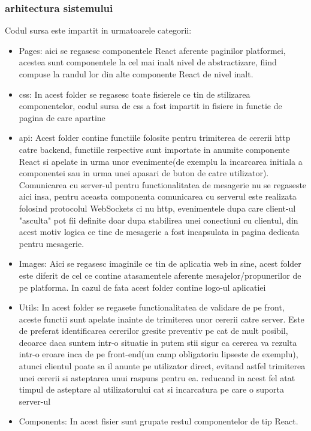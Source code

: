 \documentclass[12pt,a4paper,hidelinks]{report}
\theoremstyle{definition}
\theoremstyle{remark}
\begin{document}
\subsubsection{arhitectura sistemului}
Codul sursa este impartit in urmatoarele categorii:
\begin{itemize}
    \item Pages: aici se regasesc componentele React aferente paginilor platformei,
    acestea sunt componentele la cel mai inalt nivel de abstractizare, fiind compuse la randul lor
    din alte componente React de nivel inalt.
    \item css: In acest folder se regasesc toate fisierele ce tin de stilizarea componentelor, codul sursa de css
    a fost impartit in fisiere in functie de pagina de care apartine
    \item api: Acest folder contine functiile folosite pentru trimiterea de cererii http catre backend, functiile respective sunt importate in anumite componente React 
    si apelate in urma unor evenimente(de exemplu la incarcarea initiala a componentei sau in urma unei apasari de buton de catre utilizator). 
    Comunicarea cu server-ul pentru functionalitatea de mesagerie nu se regaseste aici insa, pentru aceasta componenta comunicarea cu serverul este realizata folosind protocolul 
    WebSockets ci nu http, evenimentele dupa care client-ul "asculta" pot fii definite doar dupa stabilirea unei conectiuni cu clientul, din acest motiv
    logica ce tine de mesagerie a fost incapsulata in pagina dedicata pentru mesagerie.
    \item Images: Aici se regasesc  imaginile ce tin de aplicatia web in sine, acest folder este diferit de cel ce contine 
    atasamentele aferente  mesajelor/propunerilor de pe platforma. In cazul de fata acest folder contine logo-ul aplicatiei
    \item Utils: In acest folder se regasete functionalitatea de validare de pe front, aceste functii sunt apelate inainte de trimiterea unor cererii catre server. 
    Este de preferat identificarea cererilor gresite preventiv pe cat de mult posibil, deoarce daca suntem intr-o situatie in putem stii sigur ca cererea va rezulta intr-o eroare inca de pe front-end(un camp obligatoriu lipseste de exemplu), 
    atunci clientul poate sa il anunte pe utilizator direct, evitand astfel trimiterea unei cererii si asteptarea unui raspuns pentru ea.
    reducand in acest fel atat timpul de asteptare al utilizatorului cat si incarcatura pe care o suporta server-ul
    \item Components: In acest fisier sunt grupate restul componentelor de tip React.

\end{itemize}
\end{document}
